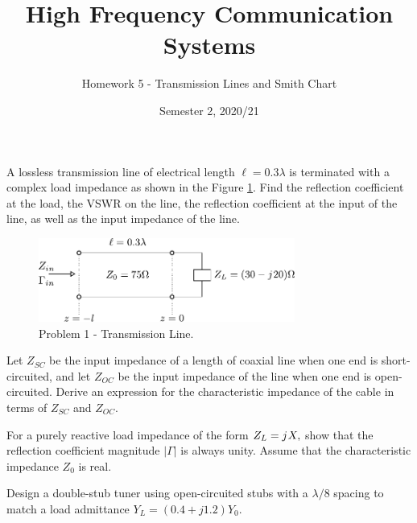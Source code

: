 \documentclass[addpoints]{exam}
\title{High Frequency Communication Systems}
\author{Homework 5 - Transmission Lines and Smith Chart}
\date{Semester 2, 2020/21}
\renewcommand{\j}{{j}\mkern1mu} %
\begin{document}
\maketitle


\begin{questions}
    \pointsinrightmargin 
    \bracketedpoints
\question[3] A lossless transmission line of electrical length $\ell=0.3 \lambda$ is terminated with a complex load impedance as shown in the Figure \ref{fig:problem1}. Find the reflection coefficient at the load, the VSWR on the line, the reflection coefficient at the input of the line, as well as the input impedance of the line.

\begin{figure}[h!]
    \centering
    \includegraphics[width = 0.75\textwidth]{problem1.pdf}
    \caption{Problem 1 - Transmission Line.}
    \label{fig:problem1}
\end{figure}


\question[2] Let $Z_{SC}$ be the input impedance of a length of coaxial line when one end is short-circuited, and let $Z_{OC}$ be the input impedance of the line when one end is open-circuited. Derive an expression for the characteristic impedance of the cable in terms of $Z_{SC}$ and $Z_{OC}$.


\question[2]
For a purely reactive load impedance of the form $Z_{L}=\j X,$ show that the reflection coefficient magnitude $|\Gamma|$ is always unity. Assume that the characteristic impedance $Z_{0}$ is real.


\question
{}

    \question[4]
    Design a double-stub tuner using open-circuited stubs with a $\lambda / 8$ spacing to match a load admittance $Y_{L}=(0.4+j 1.2) Y_{0}$.
\end{questions}
\end{document}
